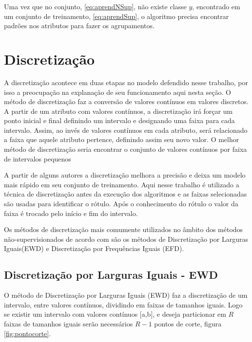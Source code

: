 Uma vez que no conjunto, \ref{eq:aprendNSup}, não existe classe ${y}$, encontrado em um conjunto de treinamento, \ref{eq:aprendSup}, o algoritmo precisa encontrar padrões nos atributos para fazer os agrupamentos.


\section{Discretização}\label{cap:refTeor:sec:discret}

A discretização acontece em duas etapas no modelo defendido nesse trabalho, por isso a preocupação na explanação de seu funcionamento aqui nesta seção. O método de discretização faz a conversão de valores contínuos em valores discretos. 
A partir de um atributo com valores contínuos, a discretização irá forçar um ponto inicial e final definindo um intervalo e designando uma faixa para cada intervalo. Assim, ao invés de valores contínuos em cada atributo, será relacionado a faixa que aquele atributo pertence, definindo assim seu novo valor. O melhor método de discretização seria encontrar o conjunto de valores contínuos por faixa de intervalos pequenos \cite{Kotsiantis2006}

A partir de alguns autores \cite{Catlett2006,Hwang2002} a discretização melhora a precisão e deixa um modelo mais rápido em seu conjunto de treinamento. Aqui nesse trabalho é utilizado a técnica de discretização antes da execução dos algoritmos e as faixas selecionadas são usadas para identificar o rótulo. Após o conhecimento do rótulo o valor da faixa é trocado pelo início e fim do intervalo.

Os métodos de discretização mais comumente utilizados no âmbito dos métodos  não-supervisionados de acordo com \cite{Kotsiantis2006, Dougherty1995} são os métodos de Discretização por Larguras Iguais(EWD) e Discretização por Frequências Iguais (EFD).

\subsection{Discretização por Larguras Iguais - EWD}\label{cap:refTeor:subsec:ewd}

O método de Discretização por Larguras Iguais (EWD) faz a discretização de um intervalo, entre valores contínuos, dividindo em faixas de tamanhos iguais. Logo se existir um intervalo com valores contínuos [a,b], e deseja particionar em ${R}$ faixas de tamanhos iguais serão necessários ${R-1}$ pontos de corte, figura \ref{fig:pontocorte}. 

